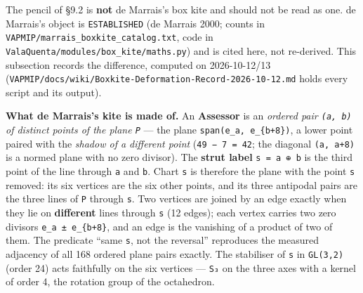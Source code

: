 \documentclass[
  10pt,
]{article}
\begin{document}
The pencil of §9.2 is \textbf{not} de Marrais's box kite and should not
be read as one. de Marrais's object is \texttt{ESTABLISHED} (de Marrais
2000; counts in \texttt{VAPMIP/marrais\_boxkite\_catalog.txt}, code in
\texttt{ValaQuenta/modules/box\_kite/maths.py}) and is cited here, not
re-derived. This subsection records the difference, computed on
2026-10-12/13
(\texttt{VAPMIP/docs/wiki/Boxkite-Deformation-Record-2026-10-12.md}
holds every script and its output).

\textbf{What de Marrais's kite is made of.} An \textbf{Assessor} is an
\emph{ordered pair \texttt{(a,\ b)} of distinct points of the plane
\texttt{P}} --- the plane \texttt{span(e\_a,\ e\_\{b+8\})}, a lower
point paired with the \emph{shadow of a different point}
(\texttt{49\ −\ 7\ =\ 42}; the diagonal \texttt{(a,\ a+8)} is a normed
plane with no zero divisor). The \textbf{strut label}
\texttt{s\ =\ a\ ⊕\ b} is the third point of the line through \texttt{a}
and \texttt{b}. Chart \texttt{s} is therefore the plane with the point
\texttt{s} removed: its six vertices are the six other points, and its
three antipodal pairs are the three lines of \texttt{P} through
\texttt{s}. Two vertices are joined by an edge exactly when they lie on
\textbf{different} lines through \texttt{s} (12 edges); each vertex
carries two zero divisors \texttt{e\_a\ ±\ e\_\{b+8\}}, and an edge is
the vanishing of a product of two of them. The predicate ``same
\texttt{s}, not the reversal'' reproduces the measured adjacency of all
168 ordered plane pairs exactly. The stabiliser of \texttt{s} in
\texttt{GL(3,2)} (order 24) acts faithfully on the six vertices ---
\texttt{S₃} on the three axes with a kernel of order 4, the rotation
group of the octahedron.
\end{document}
